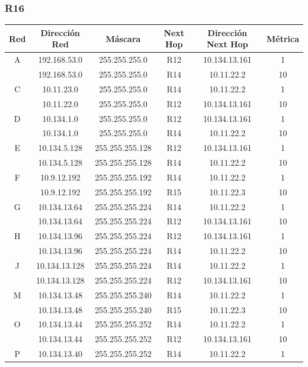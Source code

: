 \documentclass[12pt, a4paper, spanish]{article}
\begin{document}
\subsubsection{R16}
\begin{center}
\begin{tabular}{|c|c|c|c|c|c|}
	\hline
	Red & Dirección Red & Máscara & Next Hop & Dirección Next Hop & Métrica \\
	\hline
	\hline
	A & 192.168.53.0 & 255.255.255.0 & R12 & 10.134.13.161 & 1\\
	 & 192.168.53.0 & 255.255.255.0 & R14 & 10.11.22.2 & 10\\
	\hline
	C & 10.11.23.0 & 255.255.255.0 & R14 & 10.11.22.2 & 1\\
	 & 10.11.22.0 & 255.255.255.0 & R12 & 10.134.13.161 & 10\\
	\hline
	D & 10.134.1.0 & 255.255.255.0 & R12 & 10.134.13.161 & 1\\
	 & 10.134.1.0 & 255.255.255.0 & R14 & 10.11.22.2 & 10\\
	\hline
	E & 10.134.5.128 & 255.255.255.128 & R12 & 10.134.13.161 & 1\\
	 & 10.134.5.128 & 255.255.255.128 & R14 & 10.11.22.2 & 10\\
	\hline
	F & 10.9.12.192 & 255.255.255.192 & R14 & 10.11.22.2 & 1\\
	 & 10.9.12.192 & 255.255.255.192 & R15 & 10.11.22.3 & 10\\
	\hline
	G & 10.134.13.64 & 255.255.255.224 & R14 & 10.11.22.2 & 1\\
	 & 10.134.13.64 & 255.255.255.224 & R12 & 10.134.13.161 & 10\\
	\hline
	H & 10.134.13.96 & 255.255.255.224 & R12 & 10.134.13.161 & 1\\
	 & 10.134.13.96 & 255.255.255.224 & R14 & 10.11.22.2 & 10\\
	\hline
	J & 10.134.13.128 & 255.255.255.224 & R14 & 10.11.22.2 & 1\\
	 & 10.134.13.128 & 255.255.255.224 & R12 & 10.134.13.161 & 10\\
	\hline
	M & 10.134.13.48 & 255.255.255.240 & R14 & 10.11.22.2 & 1\\
	 & 10.134.13.48 & 255.255.255.240 & R15 & 10.11.22.3 & 10\\
	\hline
	O & 10.134.13.44 & 255.255.255.252 & R14 & 10.11.22.2 & 1\\
	 & 10.134.13.44 & 255.255.255.252 & R12 & 10.134.13.161 & 10\\
	\hline
	P & 10.134.13.40 & 255.255.255.252 & R14 & 10.11.22.2 & 1\\

\end{tabular}
\end{center}
\end{document}
